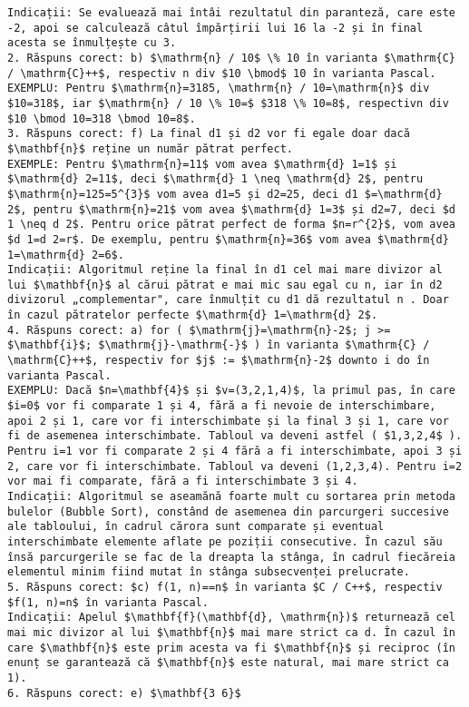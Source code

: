 \begin{verbatim}
Indicații: Se evaluează mai întâi rezultatul din paranteză, care este -2, apoi se calculează câtul împărțirii lui 16 la -2 și în final acesta se înmulțește cu 3.
2. Răspuns corect: b) $\mathrm{n} / 10$ \% 10 în varianta $\mathrm{C} / \mathrm{C}++$, respectiv n div $10 \bmod$ 10 în varianta Pascal.
EXEMPLU: Pentru $\mathrm{n}=3185, \mathrm{n} / 10=\mathrm{n}$ div $10=318$, iar $\mathrm{n} / 10 \% 10=$ $318 \% 10=8$, respectivn div $10 \bmod 10=318 \bmod 10=8$.
3. Răspuns corect: f) La final d1 și d2 vor fi egale doar dacă $\mathbf{n}$ reține un număr pătrat perfect.
EXEMPLE: Pentru $\mathrm{n}=11$ vom avea $\mathrm{d} 1=1$ și $\mathrm{d} 2=11$, deci $\mathrm{d} 1 \neq \mathrm{d} 2$, pentru $\mathrm{n}=125=5^{3}$ vom avea d1=5 și d2=25, deci d1 $=\mathrm{d} 2$, pentru $\mathrm{n}=21$ vom avea $\mathrm{d} 1=3$ și d2=7, deci $d 1 \neq d 2$. Pentru orice pătrat perfect de forma $n=r^{2}$, vom avea $d 1=d 2=r$. De exemplu, pentru $\mathrm{n}=36$ vom avea $\mathrm{d} 1=\mathrm{d} 2=6$.
Indicații: Algoritmul reține la final în d1 cel mai mare divizor al lui $\mathbf{n}$ al cărui pătrat e mai mic sau egal cu n, iar în d2 divizorul „complementar", care înmulțit cu d1 dă rezultatul n . Doar în cazul pătratelor perfecte $\mathrm{d} 1=\mathrm{d} 2$.
4. Răspuns corect: a) for ( $\mathrm{j}=\mathrm{n}-2$; j >= $\mathbf{i}$; $\mathrm{j}-\mathrm{-}$ ) în varianta $\mathrm{C} / \mathrm{C}++$, respectiv for $j$ := $\mathrm{n}-2$ downto i do în varianta Pascal.
EXEMPLU: Dacă $n=\mathbf{4}$ și $v=(3,2,1,4)$, la primul pas, în care $i=0$ vor fi comparate 1 și 4, fără a fi nevoie de interschimbare, apoi 2 și 1, care vor fi interschimbate și la final 3 și 1, care vor fi de asemenea interschimbate. Tabloul va deveni astfel ( $1,3,2,4$ ). Pentru i=1 vor fi comparate 2 și 4 fără a fi interschimbate, apoi 3 și 2, care vor fi interschimbate. Tabloul va deveni (1,2,3,4). Pentru i=2 vor mai fi comparate, fără a fi interschimbate 3 și 4.
Indicații: Algoritmul se aseamănă foarte mult cu sortarea prin metoda bulelor (Bubble Sort), constând de asemenea din parcurgeri succesive ale tabloului, în cadrul cărora sunt comparate și eventual interschimbate elemente aflate pe poziții consecutive. În cazul său însă parcurgerile se fac de la dreapta la stânga, în cadrul fiecăreia elementul minim fiind mutat în stânga subsecvenței prelucrate.
5. Răspuns corect: $c) f(1, n)==n$ în varianta $C / C++$, respectiv $f(1, n)=n$ în varianta Pascal.
Indicații: Apelul $\mathbf{f}(\mathbf{d}, \mathrm{n})$ returnează cel mai mic divizor al lui $\mathbf{n}$ mai mare strict ca d. În cazul în care $\mathbf{n}$ este prim acesta va fi $\mathbf{n}$ și reciproc (în enunț se garantează că $\mathbf{n}$ este natural, mai mare strict ca 1).
6. Răspuns corect: e) $\mathbf{3 6}$


\end{verbatim}

